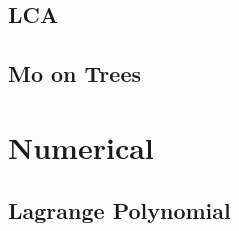 \subsection{LCA}
\raggedbottom
\hrulefill
\subsection{Mo on Trees}
\raggedbottom
\hrulefill

\section{Numerical}
\subsection{Lagrange Polynomial}
\raggedbottom
\hrulefill

